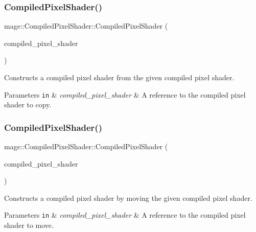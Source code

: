 \subsubsection{\texorpdfstring{Compiled\+Pixel\+Shader()}{CompiledPixelShader()}\hspace{0.1cm}{\footnotesize\ttfamily [3/4]}}
{\footnotesize\ttfamily mage\+::\+Compiled\+Pixel\+Shader\+::\+Compiled\+Pixel\+Shader (\begin{DoxyParamCaption}\item[{const \hyperlink{structmage_1_1_compiled_pixel_shader}{Compiled\+Pixel\+Shader} \&}]{compiled\+\_\+pixel\+\_\+shader }\end{DoxyParamCaption})\hspace{0.3cm}{\ttfamily [default]}}

Constructs a compiled pixel shader from the given compiled pixel shader.


\begin{DoxyParams}[1]{Parameters}
\mbox{\tt in}  & {\em compiled\+\_\+pixel\+\_\+shader} & A reference to the compiled pixel shader to copy. \\
\hline
\end{DoxyParams}
\hypertarget{structmage_1_1_compiled_pixel_shader_a472407078fe751a18d8c2ffe6e6bbef5}{}\label{structmage_1_1_compiled_pixel_shader_a472407078fe751a18d8c2ffe6e6bbef5} 
\subsubsection{\texorpdfstring{Compiled\+Pixel\+Shader()}{CompiledPixelShader()}\hspace{0.1cm}{\footnotesize\ttfamily [4/4]}}
{\footnotesize\ttfamily mage\+::\+Compiled\+Pixel\+Shader\+::\+Compiled\+Pixel\+Shader (\begin{DoxyParamCaption}\item[{\hyperlink{structmage_1_1_compiled_pixel_shader}{Compiled\+Pixel\+Shader} \&\&}]{compiled\+\_\+pixel\+\_\+shader }\end{DoxyParamCaption})\hspace{0.3cm}{\ttfamily [default]}}

Constructs a compiled pixel shader by moving the given compiled pixel shader.


\begin{DoxyParams}[1]{Parameters}
\mbox{\tt in}  & {\em compiled\+\_\+pixel\+\_\+shader} & A reference to the compiled pixel shader to move. \\
\hline
\end{DoxyParams}
\hypertarget{structmage_1_1_compiled_pixel_shader_aa108e83f2afcc6ade97f3dbaa526dee1}{}\label{structmage_1_1_compiled_pixel_shader_aa108e83f2afcc6ade97f3dbaa526dee1} 
